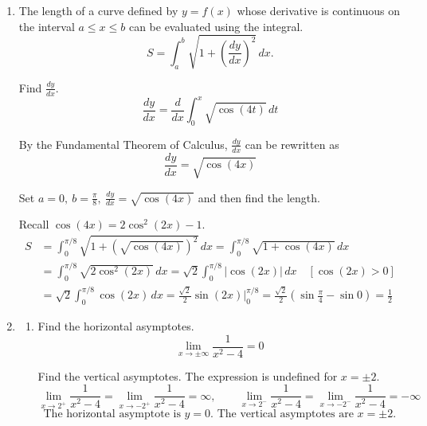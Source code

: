 \documentclass[a4paper, 12pt]{article}
\begin{document}
\begin{enumerate}[leftmargin=*,label=\textbf{\arabic*.}]
\begin{enumerate}[leftmargin=*,label=\textbf{\alph*.}]
Recall the equation $x=\sin u$.
\[x=\sin u\implies\arcsin x=u\]
\[x=\sin u\implies x^2=\sin^2u=1-\cos^2u\implies\cos u=\sqrt{1-x^2}\]

Rewrite the result of the last integral.
\[\int\frac{x^2}{2\sqrt{1-x^2}}\,dx=\frac14\left(\arcsin x-x\sqrt{1-x^2}\right)\]

Rewrite \eqref{eq:12_13_fall_final_1}.
\[\int x\arcsin x\,dx=\boxed{\frac{x^2}2\arcsin x-\frac14\arcsin x+\frac14x\sqrt{1-x^2}+c,\quad c\in\mathbb{R}}\]

\end{enumerate}

\item The length of a curve defined by $y=f(x)$ whose derivative is continuous on the interval $a\leq x\leq b$ can be evaluated using the integral.
\[S=\int_a^b\sqrt{1+\left(\frac{dy}{dx}\right)^2}\,dx.\]

Find $\displaystyle\frac{dy}{dx}$.
\[\frac{dy}{dx}=\frac d{dx}\int_0^x\sqrt{\cos(4t)}\,dt\]

By the Fundamental Theorem of Calculus, $\displaystyle\frac{dy}{dx}$ can be rewritten as
\[\frac{dy}{dx}=\sqrt{\cos(4x)}\]

Set $\displaystyle a=0,\:b=\frac\pi8,\:\frac{dy}{dx}=\sqrt{\cos(4x)}$ and then find the length.

Recall $\cos(4x)=2\cos^2(2x)-1$.
\begin{align*}S&=\int_0^{\pi/8}\sqrt{1+\left(\sqrt{\cos(4x)}\right)^2}\,dx=\int_0^{\pi/8}\sqrt{1+\cos(4x)}\,dx\\[1em]&=\int_0^{\pi/8}\sqrt{2\cos^2(2x)}\,dx=\sqrt2\int_0^{\pi/8}\left|\cos(2x)\right|\,dx\quad\left[\cos(2x)>0\right]\\[1em]&=\sqrt2\int_0^{\pi/8}\cos(2x)\,dx=\frac{\sqrt2}2\sin(2x)\bigg|_0^{\pi/8}=\frac{\sqrt2}2\left(\sin\frac\pi4-\sin0\right)=\boxed{\frac12}\end{align*}

\item \begin{enumerate}[leftmargin=*,label=\textbf{\alph*.}]

\item Find the horizontal asymptotes.
\[\lim_{x\to\pm\infty}\frac{1}{x^2-4}=0\]

Find the vertical asymptotes. The expression is undefined for $x=\pm2$.
\[\lim_{x\to2^+}\frac{1}{x^2-4}=\lim_{x\to-2^+}\frac{1}{x^2-4}=\infty,\qquad \lim_{x\to2^-}\frac{1}{x^2-4}=\lim_{x\to-2^-}\frac{1}{x^2-4}=-\infty\]
\[\boxed{\text{The horizontal asymptote is } y= 0. \text{ The vertical asymptotes are } x=\pm2.}\]


\end{enumerate}
\end{enumerate}
\end{document}
